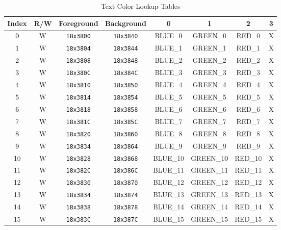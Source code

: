 \begin{table}[ht]
    \begin{center}
        \begin{tabular}{|c|c|c|c|c|c|c|c|} \hline
            Index & R/W & Foreground & Background & 0 & 1 & 2 & 3 \\ \hline\hline
            0 & W & \verb+18x3800+ & \verb+18x3840+ & BLUE\_0 & GREEN\_0 & RED\_0 & X \\ \hline
            1 & W & \verb+18x3804+ & \verb+18x3844+ & BLUE\_1 & GREEN\_1 & RED\_1 & X \\ \hline
            2 & W & \verb+18x3808+ & \verb+18x3848+ & BLUE\_2 & GREEN\_2 & RED\_2 & X \\ \hline
            3 & W & \verb+18x380C+ & \verb+18x384C+ & BLUE\_3 & GREEN\_3 & RED\_3 & X \\ \hline
            4 & W & \verb+18x3810+ & \verb+18x3850+ & BLUE\_4 & GREEN\_4 & RED\_4 & X \\ \hline
            5 & W & \verb+18x3814+ & \verb+18x3854+ & BLUE\_5 & GREEN\_5 & RED\_5 & X \\ \hline
            6 & W & \verb+18x3818+ & \verb+18x3858+ & BLUE\_6 & GREEN\_6 & RED\_6 & X \\ \hline
            7 & W & \verb+18x381C+ & \verb+18x385C+ & BLUE\_7 & GREEN\_7 & RED\_7 & X \\ \hline
            8 & W & \verb+18x3820+ & \verb+18x3860+ & BLUE\_8 & GREEN\_8 & RED\_8 & X \\ \hline
            9 & W & \verb+18x3834+ & \verb+18x3864+ & BLUE\_9 & GREEN\_9 & RED\_9 & X \\ \hline
            10 & W & \verb+18x3828+ & \verb+18x3868+ & BLUE\_10 & GREEN\_10 & RED\_10 & X \\ \hline
            11 & W & \verb+18x382C+ & \verb+18x386C+ & BLUE\_11 & GREEN\_11 & RED\_11 & X \\ \hline
            12 & W & \verb+18x3830+ & \verb+18x3870+ & BLUE\_12 & GREEN\_12 & RED\_12 & X \\ \hline
            13 & W & \verb+18x3834+ & \verb+18x3874+ & BLUE\_13 & GREEN\_13 & RED\_13 & X \\ \hline
            14 & W & \verb+18x3838+ & \verb+18x3878+ & BLUE\_14 & GREEN\_14 & RED\_14 & X \\ \hline
            15 & W & \verb+18x383C+ & \verb+18x387C+ & BLUE\_15 & GREEN\_15 & RED\_15 & X \\ \hline
        \end{tabular}
    \end{center}
    \caption{Text Color Lookup Tables}
    \label{tab:text_luts}
\end{table}

